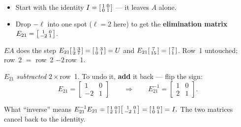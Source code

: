 \documentclass[aspectratio=169, 11pt]{beamer}
\begin{document}
\begin{frame}[t, plain]
  \begin{itemize}
    \setlength{\itemsep}{5pt}
    \item Start with the identity $I=\begin{bsmallmatrix} 1&0\\0&1 \end{bsmallmatrix}$ --- it leaves $A$ alone.
    \item Drop $-\ell$ into one spot ($\ell=2$ here) to get the \textbf{elimination matrix}
          $E_{21}=\begin{bsmallmatrix} 1&0\\-2&1 \end{bsmallmatrix}$.
  \end{itemize}
  \begin{block}{$EA$ does the step}
    $E_{21}\begin{bsmallmatrix} 1&3\\2&7 \end{bsmallmatrix} = \begin{bsmallmatrix} 1&3\\0&1 \end{bsmallmatrix} = U$ \quad and \quad
    $E_{21}\begin{bsmallmatrix} 7\\15 \end{bsmallmatrix} = \begin{bsmallmatrix} 7\\1 \end{bsmallmatrix}$. \quad Row~1 untouched; row~2 $=$ row~2 $-2\,$row~1.
  \end{block}
\end{frame}

\begin{frame}[t, plain]
  $E_{21}$ \emph{subtracted} $2\times$row~1. To undo it, \textbf{add} it back --- flip the sign:
  \[
    E_{21}=\begin{bmatrix} 1&0\\-2&1 \end{bmatrix}
    \qquad\Longrightarrow\qquad
    E_{21}^{-1}=\begin{bmatrix} 1&0\\2&1 \end{bmatrix}.
  \]
  \begin{block}{What ``inverse'' means}
    $E_{21}^{-1}E_{21} = \begin{bsmallmatrix} 1&0\\2&1 \end{bsmallmatrix}\begin{bsmallmatrix} 1&0\\-2&1 \end{bsmallmatrix} = \begin{bsmallmatrix} 1&0\\0&1 \end{bsmallmatrix} = I.$ \quad The two matrices cancel back to the identity.
  \end{block}
\end{frame}
\end{document}
